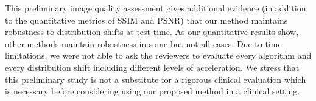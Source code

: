 This preliminary image quality assessment gives additional evidence
(in addition to the quantitative metrics of SSIM and PSNR) that our
method maintains robustness to distribution shifts at test time. As
our quantitative results show, other methods maintain robustness in
some but not all cases. Due to time limitations, we were not able to
ask the reviewers to evaluate every algorithm and every distribution
shift including different levels of acceleration. We stress that this
preliminary study is not a substitute for a rigorous clinical
evaluation which is necessary before considering using our proposed
method in a clinical setting.



